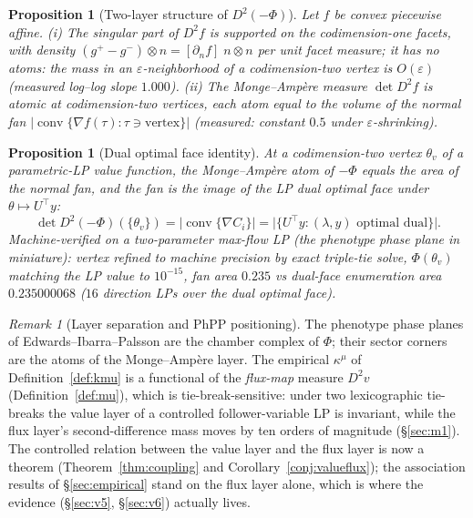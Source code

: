 \documentclass[11pt,a4paper]{article}
\theoremstyle{plain}
\newtheorem{proposition}[theorem]{Proposition}
\theoremstyle{definition}
\theoremstyle{remark}
\newtheorem{remark}[theorem]{Remark}
\newcommand{\kmu}{\kappa^{\mu}}
\begin{document}
\begin{proposition}[Two-layer structure of $D^2(-\Phi)$]\label{prop:twolayer}
Let $f$ be convex piecewise affine. (i) The singular part of $D^2 f$ is
supported on the codimension-one facets, with density
$(g^{+} - g^{-}) \otimes n = [\partial_{n} f]\; n \otimes n$ per unit facet measure; it has no
atoms: the mass in an $\varepsilon$-neighborhood of a codimension-two
vertex is $O(\varepsilon)$ (measured log--log slope $1.000$). (ii) The
Monge--Amp\`ere measure $\det D^2 f$ is atomic at codimension-two
vertices, each atom equal to the volume of the normal fan
$|\operatorname{conv}\{\nabla f(\tau) : \tau \ni \text{vertex}\}|$
(measured: constant $0.5$ under $\varepsilon$-shrinking).
\end{proposition}

\begin{proposition}[Dual optimal face identity]\label{prop:dualface}
At a codimension-two vertex $\theta_v$ of a parametric-LP value function,
the Monge--Amp\`ere atom of $-\Phi$ equals the area of the normal fan, and
the fan is the image of the LP dual optimal face under
$\theta \mapsto U^\top y$:
\[
\det D^2(-\Phi)(\{\theta_v\})
= \bigl|\operatorname{conv}\{\nabla C_i\}\bigr|
= \bigl|\{U^\top y : (\lambda, y) \text{ optimal dual}\}\bigr|.
\]
Machine-verified on a two-parameter max-flow LP (the phenotype phase
plane in miniature): vertex refined to machine precision by exact
triple-tie solve, $\Phi(\theta_v)$ matching the LP value to
$10^{-15}$, fan area $0.235$ vs dual-face enumeration area
$0.235000068$ ($16$ direction LPs over the dual optimal face).
\end{proposition}

\begin{remark}[Layer separation and PhPP positioning]\label{rem:layersep}
The phenotype phase planes of Edwards--Ibarra--Palsson
\citep{edwards2001, ibarra2002} are the chamber
complex of $\Phi$; their sector corners are the atoms of the
Monge--Amp\`ere layer. The empirical $\kmu$ of
Definition~\ref{def:kmu} is a functional of the \emph{flux-map} measure
$D^2 v$ (Definition~\ref{def:mu}), which is tie-break-sensitive: under
two lexicographic tie-breaks the value layer of a controlled
follower-variable LP is invariant, while the flux layer's
second-difference mass moves by ten orders of magnitude (\S\ref{sec:m1}). The
controlled relation between the value layer and the flux layer is now
a theorem (Theorem~\ref{thm:coupling} and
Corollary~\ref{conj:valueflux}); the association results of
\S\ref{sec:empirical} stand on the flux layer alone, which is where
the evidence (\S\ref{sec:v5}, \S\ref{sec:v6}) actually lives.
\end{remark}
\end{document}
